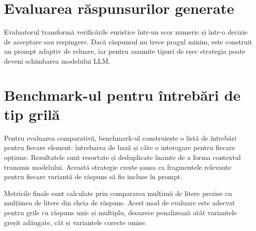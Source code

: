 \documentclass[12pt, a4paper, oneside, romanian]{teza-upb}
\begin{document}
\label{anexa:guardrail-rules}


\section{Evaluarea răspunsurilor generate}

Evaluatorul transformă verificările euristice într-un scor numeric și într-o decizie de acceptare sau respingere. Dacă răspunsul nu trece pragul minim, este construit un prompt adaptiv de reluare, iar pentru anumite tipuri de eșec strategia poate deveni schimbarea modelului LLM.

\label{anexa:evaluator-retry}


\section{Benchmark-ul pentru întrebări de tip grilă}

Pentru evaluarea comparativă, benchmark-ul construiește o listă de întrebări pentru fiecare element: întrebarea de bază și câte o interogare pentru fiecare opțiune. Rezultatele sunt resortate și deduplicate înainte de a forma contextul transmis modelului. Această strategie crește șansa ca fragmentele relevante pentru fiecare variantă de răspuns să fie incluse în prompt.

\label{anexa:benchmark-reranking}


Metricile finale sunt calculate prin compararea mulțimii de litere prezise cu mulțimea de litere din cheia de răspuns. Acest mod de evaluare este adecvat pentru grile cu răspuns unic și multiplu, deoarece penalizează atât variantele greșit adăugate, cât și variantele corecte omise.

\label{anexa:benchmark-metrics}

\end{document}
